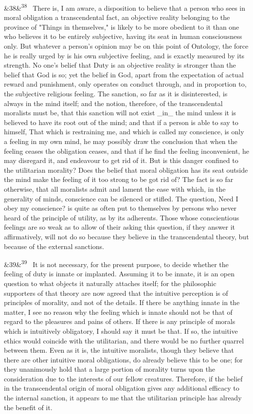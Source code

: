 \documentclass[12pt]{article}
\newcommand{\para}[1][]{\par\noindent\ifx&#1&\else\textsuperscript{\footnotesize #1}~\fi}
\begin{document}
\para[38] There is, I am aware, a disposition to believe that a person who sees in moral obligation a transcendental fact, an objective reality belonging to the province of "Things in themselves," is likely to be more obedient to it than one who believes it to be entirely subjective, having its seat in human consciousness only. But whatever a person's opinion may be on this point of Ontology, the force he is really urged by is his own subjective feeling, and is exactly measured by its strength. No one's belief that Duty is an objective reality is stronger than the belief that God is so; yet the belief in God, apart from the expectation of actual reward and punishment, only operates on conduct through, and in proportion to, the subjective religious feeling. The sanction, so far as it is disinterested, is always in the mind itself; and the notion, therefore, of the transcendental moralists must be, that this sanction will not exist \_in\_ the mind unless it is believed to have its root out of the mind; and that if a person is able to say to himself, That which is restraining me, and which is called my conscience, is only a feeling in my own mind, he may possibly draw the conclusion that when the feeling ceases the obligation ceases, and that if he find the feeling inconvenient, he may disregard it, and endeavour to get rid of it. But is this danger confined to the utilitarian morality? Does the belief that moral obligation has its seat outside the mind make the feeling of it too strong to be got rid of? The fact is so far otherwise, that all moralists admit and lament the ease with which, in the generality of minds, conscience can be silenced or stifled. The question, Need I obey my conscience? is quite as often put to themselves by persons who never heard of the principle of utility, as by its adherents. Those whose conscientious feelings are so weak as to allow of their asking this question, if they answer it affirmatively, will not do so because they believe in the transcendental theory, but because of the external sanctions.

\para[39] It is not necessary, for the present purpose, to decide whether the feeling of duty is innate or implanted. Assuming it to be innate, it is an open question to what objects it naturally attaches itself; for the philosophic supporters of that theory are now agreed that the intuitive perception is of principles of morality, and not of the details. If there be anything innate in the matter, I see no reason why the feeling which is innate should not be that of regard to the pleasures and pains of others. If there is any principle of morals which is intuitively obligatory, I should say it must be that. If so, the intuitive ethics would coincide with the utilitarian, and there would be no further quarrel between them. Even as it is, the intuitive moralists, though they believe that there are other intuitive moral obligations, do already believe this to be one; for they unanimously hold that a large portion of morality turns upon the consideration due to the interests of our fellow creatures. Therefore, if the belief in the transcendental origin of moral obligation gives any additional efficacy to the internal sanction, it appears to me that the utilitarian principle has already the benefit of it.
\end{document}
